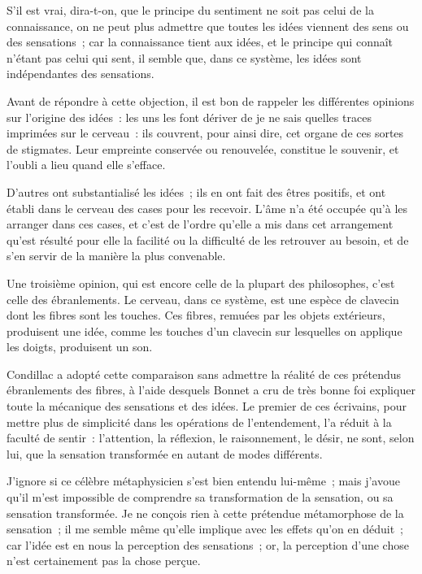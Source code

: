 \documentclass[french,twoside]{book} %
\newcommand\chaptercont{} %
\begin{document}
\chaptercont
\noindent S’il est vrai, dira-t-on, que le principe du sentiment ne soit pas celui de la connaissance, on ne peut plus admettre que toutes les idées viennent des sens ou des sensations ; car la connaissance tient aux idées, et le principe qui connaît n’étant pas celui qui sent, il semble que, dans ce système, les idées sont indépendantes des sensations.\par
Avant de répondre à cette objection, il est bon de rappeler les différentes opinions sur l’origine des idées : les uns les font dériver de je ne sais quelles traces imprimées sur le cerveau : ils couvrent, pour ainsi dire, cet organe de ces sortes de stigmates. Leur empreinte conservée ou renouvelée, constitue le souvenir, et l’oubli a lieu quand elle s’efface.\par
D’autres ont substantialisé les idées ; ils en ont fait des êtres positifs, et ont établi dans le cerveau des cases pour les recevoir. L’âme n’a été occupée qu’à les arranger dans ces cases, et c’est de l’ordre qu’elle a mis dans cet arrangement qu’est résulté pour elle la facilité ou la difficulté de les retrouver au besoin, et de s’en servir de la manière la plus convenable.\par
Une troisième opinion, qui est encore celle de la plupart des philosophes, c’est celle des ébranlements. Le cerveau, dans ce système, est une espèce de clavecin dont les fibres sont les touches. Ces fibres, remuées par les objets extérieurs, produisent une idée, comme les touches d’un clavecin sur lesquelles on applique les doigts, produisent un son.\par
Condillac a adopté cette comparaison sans admettre la réalité de ces prétendus ébranlements des fibres, à l’aide desquels Bonnet a cru de très bonne foi expliquer toute la mécanique des sensations et des idées. Le premier de ces écrivains, pour mettre plus de simplicité dans les opérations de l’entendement, l’a réduit à la faculté de sentir : l’attention, la réflexion, le raisonnement, le désir, ne sont, selon lui, que la sensation transformée en autant de modes différents.\par
J’ignore si ce célèbre métaphysicien s’est bien entendu lui-même ; mais j’avoue qu’il m’est impossible de comprendre sa transformation de la sensation, ou sa sensation transformée. Je ne conçois rien à cette prétendue métamorphose de la sensation ; il me semble même qu’elle implique avec les effets qu’on en déduit ; car l’idée est en nous la perception des sensations ; or, la perception d’une chose n’est certainement pas la chose perçue.\par
\end{document}

